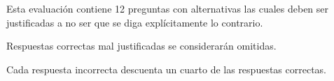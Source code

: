 \vspace{0.05\textwidth}

Esta evaluaci\'on contiene 12 preguntas con alternativas las cuales deben ser justificadas a no ser que se diga expl\'icitamente lo contrario.

Respuestas correctas mal justificadas se considerar\'an omitidas.

Cada respuesta incorrecta descuenta un cuarto de las respuestas correctas.